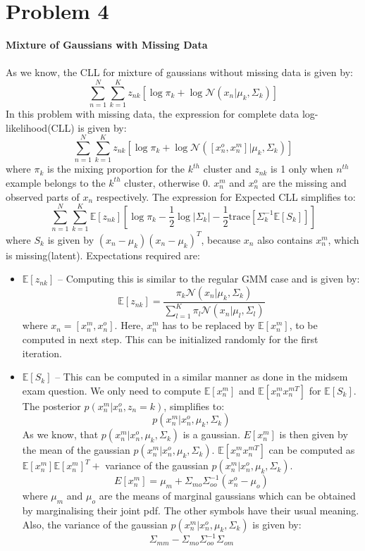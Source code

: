 \documentclass{article}
\begin{document}
\section*{Problem 4}
\textbf{Mixture of Gaussians with Missing Data} \\ \\
As we know, the CLL for mixture of gaussians without missing data is given by:
$$\sum_{n=1}^N\sum_{k=1}^K z_{nk}[\log \pi_k + \log \mathcal{N}(x_n|\mu_k, \Sigma_k)]$$
In this problem with missing data, the expression for complete data log-likelihood(CLL) is given by:
$$\sum_{n=1}^N\sum_{k=1}^K z_{nk}[\log \pi_k + \log \mathcal{N}([x_n^{o}, x_n^{m}]|\mu_k, \Sigma_k)]$$
where $\pi_k$ is the mixing proportion for the $k^{th}$ cluster and $z_{nk}$ is 1 only when $n^{th}$ example belongs to the $k^{th}$ cluster, otherwise 0. $x_n^m$ and $x_n^o$ are the missing and observed parts of $x_n$ respectively. The expression for Expected CLL simplifies to:
$$\sum_{n=1}^N\sum_{k=1}^K \mathds{E}[z_{nk}][\log \pi_k - \frac{1}{2}\log |\Sigma_k| - \frac{1}{2}\text{trace}[\Sigma_k^{-1}\mathds{E}[S_k]]]$$
where $S_k$ is given by $(x_n-\mu_k)(x_n-\mu_k)^T$, because $x_n$ also contains $x_n^m$, which is missing(latent). Expectations required are:
\begin{itemize}
\item $\mathds{E}[z_{nk}]$ --  Computing this is similar to the regular GMM case and is given by:
$$\mathds{E}[z_{nk}] = \frac{\pi_k\mathcal{N}(x_n|\mu_k, \Sigma_k)}{\sum_{l=1}^K \pi_l\mathcal{N}(x_n|\mu_l, \Sigma_l)}$$
where $x_n = [x_n^m, x_n^o]$. Here, $x_n^m$ has to be replaced by $\mathds{E}[x_n^m]$, to be computed in next step. This can be initialized randomly for the first iteration.
\item $\mathds{E}[S_{k}]$ -- This can be computed in a similar manner as done in the midsem exam question. We only need to compute $\mathds{E}[x_n^m]$ and $\mathds{E}[x_n^mx_n^{mT}]$ for $\mathds{E}[S_{k}]$. The posterior $p(x_n^m|x_n^o, z_n=k)$, simplifies to:
$$p(x_n^m|x_n^o, \mu_k, \Sigma_k)$$
As we know, that $p(x_n^m|x_n^o, \mu_k, \Sigma_k)$ is a gaussian. $E[x_n^m]$ is then given by the mean of the gaussian $p(x_n^m|x_n^o, \mu_k, \Sigma_k)$. $\mathds{E}[x_n^mx_n^{mT}]$ can be computed as $\mathds{E}[x_n^m]\mathds{E}[x_n^{m}]^T + $ variance of the gaussian $p(x_n^m|x_n^o, \mu_k, \Sigma_k)$.
$$E[x_n^m] = \mu_{m} + \Sigma_{mo}\Sigma_{oo}^{-1}(x_n^o-\mu_o)$$
where $\mu_{m}$ and $\mu_{o}$ are the means of marginal gaussians which can be obtained by marginalising their joint pdf. The other symbols have their usual meaning. Also, the variance of the gaussian $p(x_n^m|x_n^o, \mu_k, \Sigma_k)$ is given by:
$$\Sigma_{mm}-\Sigma_{mo}\Sigma_{oo}^{-1}\Sigma_{om}$$
\end{itemize}
\end{document}
